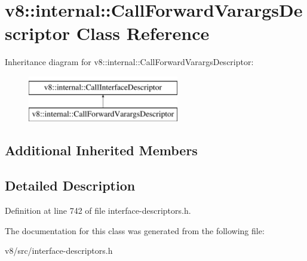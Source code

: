 \hypertarget{classv8_1_1internal_1_1CallForwardVarargsDescriptor}{}\section{v8\+:\+:internal\+:\+:Call\+Forward\+Varargs\+Descriptor Class Reference}
\label{classv8_1_1internal_1_1CallForwardVarargsDescriptor}
Inheritance diagram for v8\+:\+:internal\+:\+:Call\+Forward\+Varargs\+Descriptor\+:\begin{figure}[H]
\begin{center}
\leavevmode
\includegraphics[height=2.000000cm]{classv8_1_1internal_1_1CallForwardVarargsDescriptor}
\end{center}
\end{figure}
\subsection*{Additional Inherited Members}


\subsection{Detailed Description}


Definition at line 742 of file interface-\/descriptors.\+h.



The documentation for this class was generated from the following file\+:\begin{DoxyCompactItemize}
\item 
v8/src/interface-\/descriptors.\+h\end{DoxyCompactItemize}
